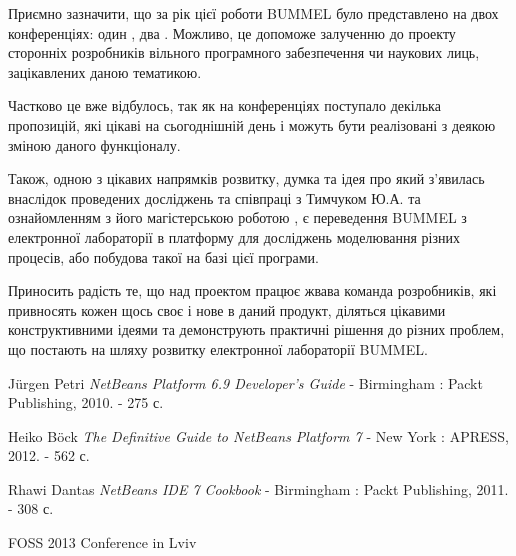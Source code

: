 \documentclass[12pt,a4paper]{article}
\begin{document}
Приємно зазначити, що за рік цієї роботи BUMMEL було представлено на двох конференціях: один
, два \cite{thesis-foss2013}. Можливо, це допоможе залученню до проекту сторонніх розробників вільного програмного забезпечення чи наукових лиць, зацікавлених даною тематикою.

Частково це вже відбулось, так як на конференціях поступало декілька пропозицій, які цікаві на сьогоднішній день і можуть бути реалізовані з деякою зміною даного функціоналу.

Також, одною з цікавих напрямків розвитку, думка та ідея про який з’явилась внаслідок проведених досліджень та співпраці з Тимчуком Ю.А. та ознайомленням з його магістерською роботою
, є переведення BUMMEL з електронної лабораторії в платформу для досліджень моделювання різних процесів, або побудова такої на базі цієї програми.

Приносить радість те, що над проектом працює жвава команда розробників, які привносять кожен щось своє і нове в даний продукт, діляться цікавими конструктивними ідеями та демонструють практичні рішення до різних проблем, що постають на шляху розвитку електронної лабораторії BUMMEL.

\clearpage

\begin{thebibliography}{9}



  Jürgen Petri \emph{NetBeans Platform 6.9 Developer's Guide}
     - Birmingham : Packt Publishing, 2010. - 275 с.

  Heiko Böck \emph{The Definitive Guide to NetBeans Platform 7}
     - New York : APRESS, 2012. - 562 с.

  Rhawi Dantas \emph{NetBeans IDE 7 Cookbook}
     - Birmingham : Packt Publishing, 2011. - 308 с.

  FOSS 2013 Conference in Lviv
















\end{thebibliography}
\end{document}
